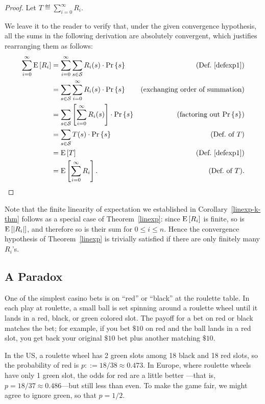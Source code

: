 \documentclass[11pt,twoside]{article}
\begin{document}
\begin{proof}
Let $T \eqdef \sum_{i = 0}^\infty R_i$.

We leave it to the reader to verify that, under the given convergence
hypothesis, all the sums in the following derivation are absolutely
convergent, which justifies rearranging them as follows:
\begin{align*}
\sum_{i=0}^\infty \expect{R_i}
    &= \sum_{i=0}^\infty \sum_{s \in \sspace} R_i(s) \cdot \prob{s} 
            & \text{(Def.~\ref{defexp1})}\\
    &= \sum_{s \in \sspace} \sum_{i=0}^\infty R_i(s) \cdot \prob{s} 
           & \text{(exchanging order of summation)}\\
    &= \sum_{s \in \sspace} \left[ \sum_{i=0}^\infty R_i(s) \right] \cdot \prob{s}
                & \text{(factoring out $\pr{s}$)}\\
    &= \sum_{s \in \sspace} T(s) \cdot \prob{s} & \text{(Def.\ of $T$)}\\
    &= \expect{T} & \text{(Def.~\ref{defexp1})}\\
    &= \expect{\sum_{i = 0}^\infty R_i}. &  \text{(Def.\ of $T$)}.
\end{align*}
\end{proof}

Note that the finite linearity of expectation we established in
Corollary~\ref{linexp-k-thm} follows as a special case of
Theorem~\ref{linexp}: since $\mathop{\textup{E}}\nolimits\left[R_i\right]$ is finite, so is
$\mathop{\textup{E}}\nolimits\left[\left|R_i\right|\right]$, and therefore so is their sum for $0 \leq i \leq n$.
Hence the convergence hypothesis of Theorem~\ref{linexp} is trivially
satisfied if there are only finitely many $R_i$'s.

\subsection{A Paradox}
One of the simplest casino bets is on ``red'' or ``black'' at the roulette
table.  In each play at roulette, a small ball is set spinning around a
roulette wheel until it lands in a red, black, or green colored slot.
The payoff for a bet on red or black matches the bet; for example, if you bet
$\$10$ on red and the ball lands in a red slot, you get back your original
$\$10$ bet plus another matching $\$10$.

In the US, a roulette wheel has 2 green slots among 18 black and 18 red
slots, so the probability of red is $p::= 18/38 \approx 0.473$.  In
Europe, where roulette wheels have only 1 green slot, the odds for red
are a little better ---that is, $p = 18/37 \approx 0.486$---but still less
than even.  To make the game fair, we might agree to ignore green, so that
$p = 1/2$.
\end{document}

